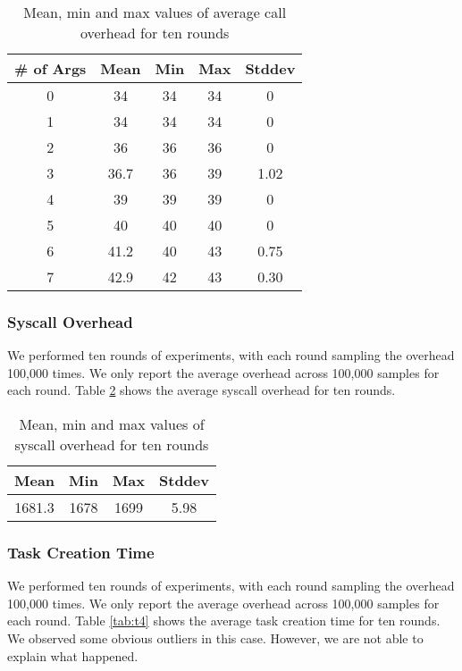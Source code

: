 \begin{table}[htb]

\caption{Mean, min and max values of average call overhead for ten rounds}

    \begin{tabular}{|c|c|c|c|c|} 
     \hline
     \# of Args & Mean & Min & Max & Stddev \\ 
     \hline
     0 & 34 & 34 & 34 & 0 \\ 
     \hline
     1 & 34 & 34 & 34 & 0\\ 
     \hline
     2 & 36 & 36 & 36 & 0\\ 
     \hline
     3 & 36.7 & 36 & 39 & 1.02\\ 
     \hline
     4 & 39 & 39 & 39 & 0\\ 
     \hline
     5 & 40 & 40 & 40 & 0\\ 
     \hline
     6 & 41.2 & 40 & 43 & 0.75 \\ 
     \hline
     7 & 42.9 & 42 & 43 & 0.30\\ 
     \hline
    \end{tabular}
    \label{tab:t2}
\end{table}


\subsubsection{Syscall Overhead}
We performed ten rounds of experiments, with each round sampling the overhead 100,000 times. We only report the average overhead across 100,000 samples for each round.
Table \ref{tab:t3} shows the average syscall overhead for ten rounds. 

\begin{table}[tb]

    \caption{Mean, min and max values of syscall overhead for ten rounds}
    
    \begin{tabular}{|c|c|c|c|} 
        \hline
        Mean & Min & Max & Stddev\\ 
        \hline
        1681.3 & 1678 & 1699 & 5.98\\ 
        \hline
       \end{tabular}
        \label{tab:t3}
\end{table}

    
\subsubsection{Task Creation Time}
\label{subsubsec:tct}
We performed ten rounds of experiments, with each round sampling the overhead 100,000 times. We only report the average overhead across 100,000 samples for each round.
Table \ref{tab:t4} shows the average task creation time for ten rounds. We observed some obvious outliers in this case. However, we are not able to explain what happened.

